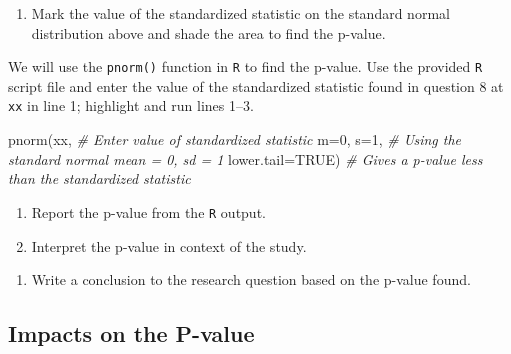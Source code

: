 \documentclass[
]{report}
\newenvironment{Shaded}{\begin{snugshade}}{\end{snugshade}}
\newcommand{\AttributeTok}[1]{\textcolor[rgb]{0.77,0.63,0.00}{#1}}
\newcommand{\CommentTok}[1]{\textcolor[rgb]{0.56,0.35,0.01}{\textit{#1}}}
\newcommand{\ConstantTok}[1]{\textcolor[rgb]{0.00,0.00,0.00}{#1}}
\newcommand{\DecValTok}[1]{\textcolor[rgb]{0.00,0.00,0.81}{#1}}
\newcommand{\FunctionTok}[1]{\textcolor[rgb]{0.00,0.00,0.00}{#1}}
\newcommand{\NormalTok}[1]{#1}
\providecommand{\tightlist}{%
  \setlength{\itemsep}{0pt}\setlength{\parskip}{0pt}}
\begin{document}
\begin{enumerate}
\def\labelenumi{\arabic{enumi}.}
\setcounter{enumi}{7}
\tightlist
\item
  Mark the value of the standardized statistic on the standard normal distribution above and shade the area to find the p-value.
\end{enumerate}

\vspace{0.1in}

We will use the \texttt{pnorm()} function in \texttt{R} to find the p-value. Use the provided \texttt{R} script file and enter the value of the standardized statistic found in question 8 at \texttt{xx} in line 1; highlight and run lines 1--3.

\begin{Shaded}
\begin{Highlighting}[]
\FunctionTok{pnorm}\NormalTok{(xx, }\CommentTok{\# Enter value of standardized statistic}
      \AttributeTok{m=}\DecValTok{0}\NormalTok{, }\AttributeTok{s=}\DecValTok{1}\NormalTok{, }\CommentTok{\# Using the standard normal mean = 0, sd = 1}
      \AttributeTok{lower.tail=}\ConstantTok{TRUE}\NormalTok{) }\CommentTok{\# Gives a p{-}value less than the standardized statistic}
\end{Highlighting}
\end{Shaded}

\begin{enumerate}
\def\labelenumi{\arabic{enumi}.}
\setcounter{enumi}{8}
\item
  Report the p-value from the \texttt{R} output.
  \vspace{0.2in}
\item
  Interpret the p-value in context of the study.
\end{enumerate}

\vspace{0.5in}

\begin{enumerate}
\def\labelenumi{\arabic{enumi}.}
\setcounter{enumi}{10}
\tightlist
\item
  Write a conclusion to the research question based on the p-value found.
\end{enumerate}

\vspace{1in}

\hypertarget{impacts-on-the-p-value}{%
\subsection*{Impacts on the P-value}\label{impacts-on-the-p-value}}
\end{document}
